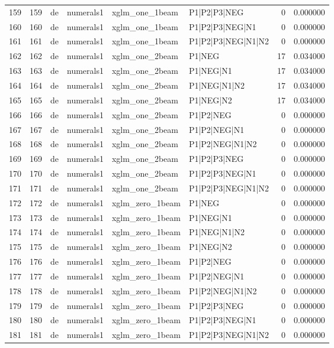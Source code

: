 \begin{tabular}{lrllllrr}
159 & 159 & de & numerals1 & xglm_one_1beam & P1|P2|P3|NEG & 0 & 0.000000 \\
160 & 160 & de & numerals1 & xglm_one_1beam & P1|P2|P3|NEG|N1 & 0 & 0.000000 \\
161 & 161 & de & numerals1 & xglm_one_1beam & P1|P2|P3|NEG|N1|N2 & 0 & 0.000000 \\
162 & 162 & de & numerals1 & xglm_one_2beam & P1|NEG & 17 & 0.034000 \\
163 & 163 & de & numerals1 & xglm_one_2beam & P1|NEG|N1 & 17 & 0.034000 \\
164 & 164 & de & numerals1 & xglm_one_2beam & P1|NEG|N1|N2 & 17 & 0.034000 \\
165 & 165 & de & numerals1 & xglm_one_2beam & P1|NEG|N2 & 17 & 0.034000 \\
166 & 166 & de & numerals1 & xglm_one_2beam & P1|P2|NEG & 0 & 0.000000 \\
167 & 167 & de & numerals1 & xglm_one_2beam & P1|P2|NEG|N1 & 0 & 0.000000 \\
168 & 168 & de & numerals1 & xglm_one_2beam & P1|P2|NEG|N1|N2 & 0 & 0.000000 \\
169 & 169 & de & numerals1 & xglm_one_2beam & P1|P2|P3|NEG & 0 & 0.000000 \\
170 & 170 & de & numerals1 & xglm_one_2beam & P1|P2|P3|NEG|N1 & 0 & 0.000000 \\
171 & 171 & de & numerals1 & xglm_one_2beam & P1|P2|P3|NEG|N1|N2 & 0 & 0.000000 \\
172 & 172 & de & numerals1 & xglm_zero_1beam & P1|NEG & 0 & 0.000000 \\
173 & 173 & de & numerals1 & xglm_zero_1beam & P1|NEG|N1 & 0 & 0.000000 \\
174 & 174 & de & numerals1 & xglm_zero_1beam & P1|NEG|N1|N2 & 0 & 0.000000 \\
175 & 175 & de & numerals1 & xglm_zero_1beam & P1|NEG|N2 & 0 & 0.000000 \\
176 & 176 & de & numerals1 & xglm_zero_1beam & P1|P2|NEG & 0 & 0.000000 \\
177 & 177 & de & numerals1 & xglm_zero_1beam & P1|P2|NEG|N1 & 0 & 0.000000 \\
178 & 178 & de & numerals1 & xglm_zero_1beam & P1|P2|NEG|N1|N2 & 0 & 0.000000 \\
179 & 179 & de & numerals1 & xglm_zero_1beam & P1|P2|P3|NEG & 0 & 0.000000 \\
180 & 180 & de & numerals1 & xglm_zero_1beam & P1|P2|P3|NEG|N1 & 0 & 0.000000 \\
181 & 181 & de & numerals1 & xglm_zero_1beam & P1|P2|P3|NEG|N1|N2 & 0 & 0.000000 \\

\end{tabular}
